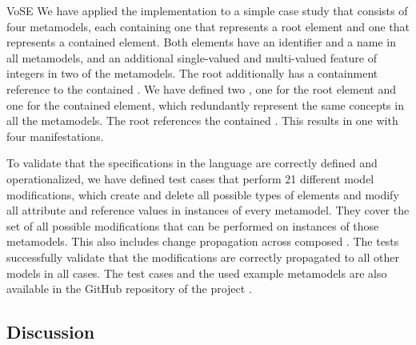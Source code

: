\begin{copiedFrom}{VoSE}
We have applied the implementation to a simple case study that consists of four metamodels, each containing one \metaclass that represents a root element and one that represents a contained element. 
Both elements have an identifier and a name in all metamodels, and an additional single-valued and multi-valued feature of integers in two of the metamodels.
The root \metaclass additionally has a containment reference to the contained \metaclass.
We have defined two \commonalities, one for the root element and one for the contained element, which redundantly represent the same concepts in all the metamodels.
The root \commonality references the contained \commonality.
This results in one \conceptmetamodel with four manifestations.

To validate that the specifications in the \commonalities language are correctly defined and operationalized, we have
defined test cases that perform 21 different model modifications, which 
%
create and delete all possible types of elements and modify all attribute and reference values in instances of every metamodel.
They cover the set of all possible modifications that can be performed on instances of those metamodels.
This also includes change propagation across composed \commonalities.
The tests successfully validate that the modifications are correctly propagated to all other models in all cases.
The test cases and the used example metamodels are also available in the GitHub repository of the \vitruv project \cite{vitruvFrameworkGithub}. %


\subsection*{Discussion}



\end{copiedFrom}
